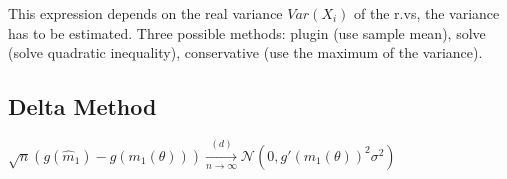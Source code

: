 This expression depends on the real variance $Var(X_i)$ of the r.vs, the variance has to be estimated. Three possible methods: plugin (use sample mean), solve (solve quadratic inequality), conservative (use the maximum of the variance).\\

\subsection*{Delta Method}

$\sqrt{n}(g(\widehat{m}_1) - g(m_1(\theta ))) \xrightarrow [n \to \infty ]{(d)} \mathcal{N}(0, g'(m_1(\theta ))^2 \sigma ^2)$

